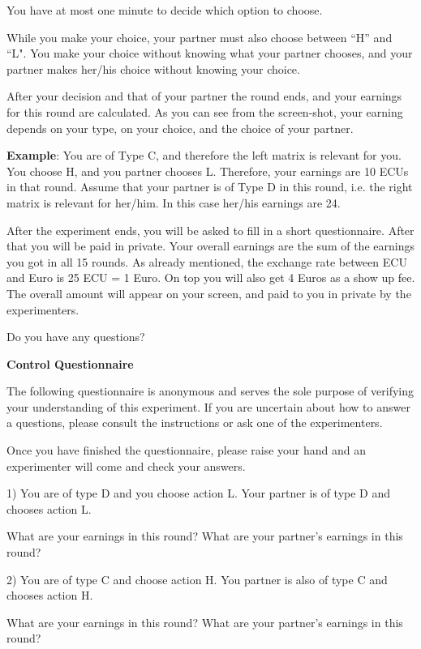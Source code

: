 \documentclass[12pt]{article}
\theoremstyle{break}
\begin{document}
You have at most one minute to decide which option to choose.

While you make your choice, your partner must also choose between ``H'' and ``L". You make your choice without knowing what your partner chooses, and your partner makes her/his choice without knowing your choice. 

After your decision and that of your partner the round ends, and your earnings for this round are calculated. As you can see from the screen-shot, your earning depends on your type, on your choice, and the choice of your partner. 

\textbf{Example}: You are of Type C, and therefore the left matrix is relevant for you. You choose H, and you partner chooses L. Therefore, your earnings are 10 ECUs in that round. Assume that your partner is of Type D in this round, i.e. the right matrix is relevant for her/him. In this case her/his earnings are 24. 

After the experiment ends, you will be asked to fill in a short questionnaire. After that you will be paid in private. Your overall earnings are the sum of the earnings you got in all 15 rounds. As already mentioned, the exchange rate between ECU and Euro is 25 ECU = 1 Euro. On top you will also get 4 Euros as a show up fee. The overall amount will appear on your screen, and paid to you in private by the experimenters. 

Do you have any questions? 




\textbf{Control Questionnaire}

The following questionnaire is anonymous and serves the sole purpose of verifying your understanding of this experiment. If you are uncertain about how to answer a questions, please consult the instructions or ask one of the experimenters.

Once you have finished the questionnaire, please raise your hand and an experimenter will come and check your answers.

1) You are of type D and you choose action L. Your partner is of type D and chooses action L.

What are your earnings in this round?
What are your partner’s earnings in this round?

2) You are of type C and choose action H. You partner is also of type C and chooses action H.

What are your earnings in this round?
What are your partner’s earnings in this round?
\end{document}
